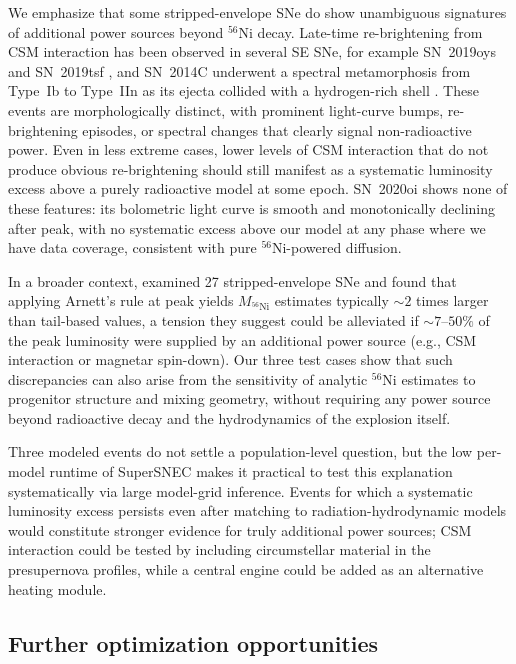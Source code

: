 \documentclass[twocolumn,linenumbers]{aastex701}
\begin{document}
We emphasize that some stripped-envelope SNe do show unambiguous signatures of additional power sources beyond $^{56}$Ni decay. Late-time re-brightening from CSM interaction has been observed in several SE SNe, for example SN~2019oys and SN~2019tsf \citep{Sollerman2020}, and SN~2014C underwent a spectral metamorphosis from Type~Ib to Type~IIn as its ejecta collided with a hydrogen-rich shell \citep{Milisavljevic2015}. These events are morphologically distinct, with prominent light-curve bumps, re-brightening episodes, or spectral changes that clearly signal non-radioactive power. Even in less extreme cases, lower levels of CSM interaction that do not produce obvious re-brightening should still manifest as a systematic luminosity excess above a purely radioactive model at some epoch. SN~2020oi shows none of these features: its bolometric light curve is smooth and monotonically declining after peak, with no systematic excess above our model at any phase where we have data coverage, consistent with pure $^{56}$Ni-powered diffusion.

In a broader context, \citet{Afsariardchi2021} examined 27 stripped-envelope SNe and found that applying Arnett's rule \citep{Arnett1982} at peak yields $M_{^{56}\mathrm{Ni}}$ estimates typically ${\sim}2$ times larger than tail-based values, a tension they suggest could be alleviated if ${\sim}7$--$50\%$ of the peak luminosity were supplied by an additional power source (e.g., CSM interaction or magnetar spin-down). Our three test cases show that such discrepancies can also arise from the sensitivity of analytic $^{56}$Ni estimates to progenitor structure and mixing geometry, without requiring any power source beyond radioactive decay and the hydrodynamics of the explosion itself.

Three modeled events do not settle a population-level question, but the low per-model runtime of SuperSNEC makes it practical to test this explanation systematically via large model-grid inference. Events for which a systematic luminosity excess persists even after matching to radiation-hydrodynamic models would constitute stronger evidence for truly additional power sources; CSM interaction could be tested by including circumstellar material in the presupernova profiles, while a central engine could be added as an alternative heating module.

\subsection{Further optimization opportunities}
\end{document}
